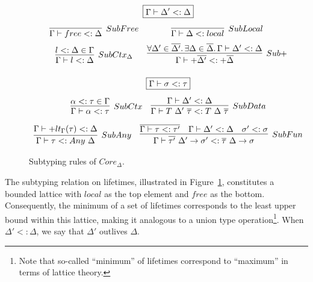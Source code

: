 \documentclass[11pt]{article}
\newcommand{\mathframebox}[1]{\framebox{$\displaystyle #1$}}
\newcommand{\ap}{~}
\begin{document}
    \begin{figure}
        \begin{gather*}
            \mathframebox{\Gamma\vdash\Delta' <: \Delta} \\[0.5em]
            \begin{array}{cc}
                \infer[SubFree]{\Gamma\vdash free <: \Delta}{} &
                \infer[SubLocal]{\Gamma\vdash\Delta <: local}{} \\[0.5em]
                \infer[SubCtx_\Delta]{
                    \Gamma\vdash l <: \Delta
                }{
                    l <: \Delta \in \Gamma
                } &
                \infer[Sub+]{
                    \Gamma\vdash+\overline{\Delta'} <: +\overline{\Delta}
                }{
                    \forall\Delta'\in\overline{\Delta'}\ldotp\exists\Delta\in\overline{\Delta}\ldotp \Gamma\vdash\Delta' <: \Delta
                }
            \end{array}\\[1em]
            \mathframebox{\Gamma\vdash \sigma <: \tau} \\[0.5em]
            \begin{array}{cc}
                \infer[SubCtx]{\Gamma\vdash \alpha <: \tau}{\alpha <: \tau \in \Gamma} &
                \infer[SubData]{
                    \Gamma\vdash T\ap\Delta'\ap\overline{\tau} <: T\ap\Delta\ap\overline{\tau}
                }{
                    \Gamma\vdash\Delta' <: \Delta
                }
            \end{array} \\[0.5em]
            \begin{array}{cc}
                \infer[SubAny]{
                    \Gamma\vdash \tau <: Any\ap\Delta
                }{
                    \Gamma\vdash +lt_\Gamma(\tau) <: \Delta
                } &
                \infer[SubFun]{
                    \Gamma\vdash\overline{\tau'}~\Delta'\to\sigma' <: \overline{\tau}~\Delta\to\sigma
                }{
                    \overline{\Gamma\vdash\tau <: \tau'} &
                    \Gamma\vdash\Delta' <: \Delta &
                    \sigma' <: \sigma
                }
            \end{array}
        \end{gather*}
        \caption{Subtyping rules of $Core_{\Delta}$.}
        \label{fig:core-subtyping}
    \end{figure}

    The subtyping relation on lifetimes, illustrated in Figure\ \ref{fig:core-subtyping}, constitutes a bounded lattice with $local$ as the top element and $free$ as the bottom.
    Consequently, the minimum of a set of lifetimes corresponds to the least upper bound within this lattice, making it analogous to a union type operation\footnote{Note that so-called ``minimum'' of lifetimes correspond to ``maximum'' in terms of lattice theory.}.
    When $\Delta' <: \Delta$, we say that $\Delta'$ outlives $\Delta$.
\end{document}
